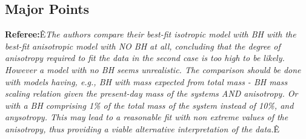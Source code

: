 \documentclass[11pt]{article}
\begin{document}
\newpage
\noindent\makebox[\linewidth]{\rule{17cm}{1pt}}\vspace{-0.5cm}
\begin{center}
  \section{Major Points}
\end{center}
\noindent\makebox[\linewidth]{\rule{17cm}{1pt}}

\vspace{0.2cm}

{\bf Referee:}Ê{\it The authors compare their best-fit isotropic model with BH with the best-fit anisotropic model with NO BH at all, concluding that the degree of anisotropy required to fit the data in the second case is too high to be likely. However a model with no BH seems unrealistic. The comparison should be done with models having, e.g., BH with mass expected from total mass - BH mass scaling relation given the present-day mass of the systems AND anisotropy. Or with a BH comprising 1\% of the total mass of the system instead of 10\%, and anysotropy. This may lead to a reasonable fit with non extreme values of the anisotropy, thus providing a viable alternative interpretation of the data.}Ê
\end{document}
